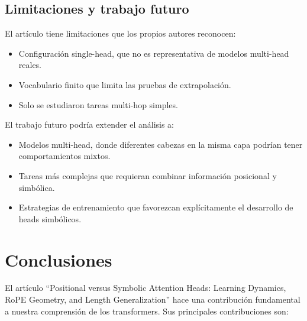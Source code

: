 \documentclass[12pt,a4paper,oneside]{report}
\begin{document}
\section{Limitaciones y trabajo futuro}

El artículo tiene limitaciones que los propios autores reconocen:
\begin{itemize}
    \item Configuración single-head, que no es representativa de modelos multi-head reales.
    \item Vocabulario finito que limita las pruebas de extrapolación.
    \item Solo se estudiaron tareas multi-hop simples.
\end{itemize}

El trabajo futuro podría extender el análisis a:
\begin{itemize}
    \item Modelos multi-head, donde diferentes cabezas en la misma capa podrían tener comportamientos mixtos.
    \item Tareas más complejas que requieran combinar información posicional y simbólica.
    \item Estrategias de entrenamiento que favorezcan explícitamente el desarrollo de heads simbólicos.
\end{itemize}

\chapter{Conclusiones}

El artículo ``Positional versus Symbolic Attention Heads: Learning Dynamics, RoPE Geometry, and Length Generalization'' hace una contribución fundamental a nuestra comprensión de los transformers. Sus principales contribuciones son:
\end{document}
